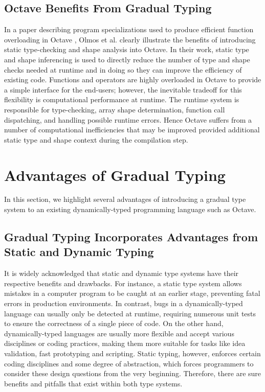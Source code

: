 \subsection{Octave Benefits From Gradual Typing}
In a paper describing program specializations used to produce efficient function overloading in Octave \cite{olmos2003turning}, Olmos et al. clearly illustrate the benefits of introducing static type-checking and shape analysis into Octave. In their work, static type and shape inferencing is used to directly reduce the number of type and shape checks needed at runtime and in doing so they can improve the efficiency of existing code. Functions and operators are highly overloaded in Octave to provide a simple interface for the end-users; however, the inevitable tradeoff for this flexibility is computational performance at runtime. The runtime system is responsible for type-checking, array shape determination, function call dispatching, and handling possible runtime errors. Hence Octave suffers from a number of computational inefficiencies that may be improved provided additional static type and shape context during the compilation step.

\section{Advantages of Gradual Typing}
In this section, we highlight several advantages of introducing a gradual type system to an existing dynamically-typed programming language such as Octave.

\subsection{Gradual Typing Incorporates Advantages from Static and Dynamic Typing}
It is widely acknowledged that static and dynamic type systems have their respective benefits and drawbacks. For instance, a static type system allows mistakes in a computer program to be caught at an earlier stage, preventing fatal errors in production environments. In contrast, bugs in a dynamically-typed language can usually only be detected at runtime, requiring numerous unit tests to ensure the correctness of a single piece of code. On the other hand, dynamically-typed languages are usually more flexible and accept various disciplines or coding practices, making them more suitable for tasks like idea validation, fast prototyping and scripting. Static typing, however, enforces certain coding disciplines and some degree of abstraction, which forces programmers to consider these design questions from the very beginning. Therefore, there are sure benefits and pitfalls that exist within both type systems.

